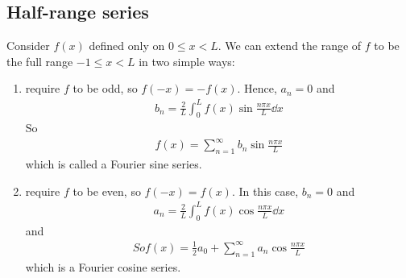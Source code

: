     \subsection{Half-range series}
    Consider $f(x)$ defined only on $0 \leq x < L$.
    We can extend the range of $f$ to be the full range $-1 \leq x < L$ in two simple ways:
    \begin{enumerate}
        \item require $f$ to be odd, so $f(-x) = -f(x)$.
            Hence, $a_n = 0$ and
            \begin{align*}
                b_n = \frac{2}{L} \int_0^L f(x) \sin \frac{n \pi x}{L} \dd{x}
            \end{align*}
            So
            \begin{align*}
                f(x) = \sum_{n=1}^\infty b_n \sin \frac{n\pi x}{L}
            \end{align*}
            which is called a Fourier sine series.
        \item require $f$ to be even, so $f(-x) = f(x)$.
            In this case, $b_n = 0$ and
            \begin{align*}
                a_n = \frac{2}{L} \int_0^L f(x) \cos \frac{n \pi x}{L} \dd{x}
            \end{align*}
            and
            \begin{align*}
                So f(x) = \frac{1}{2}a_0 + \sum_{n=1}^\infty a_n \cos \frac{n\pi x}{L}
            \end{align*}
            which is a Fourier cosine series.
    \end{enumerate}

